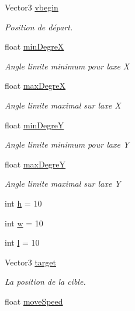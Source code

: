 \begin{DoxyCompactItemize}
Vector3 \mbox{\hyperlink{class_camera_control_a3d18c8c72678abfe638f07483c437b92}{vbegin}}
\begin{DoxyCompactList}\small\item\em Position de départ. \end{DoxyCompactList}\item 
float \mbox{\hyperlink{class_camera_control_a116fb7ac920ed4c84894420690b15174}{min\+DegreX}}
\begin{DoxyCompactList}\small\item\em Angle limite minimum pour l\textquotesingle{}axe X \end{DoxyCompactList}\item 
float \mbox{\hyperlink{class_camera_control_ad9804e1cf6d924768e6484ab8a0c34fa}{max\+DegreX}}
\begin{DoxyCompactList}\small\item\em Angle limite maximal sur l\textquotesingle{}axe X \end{DoxyCompactList}\item 
float \mbox{\hyperlink{class_camera_control_a7e187cb1ebfb3675d77110a8f1b99d83}{min\+DegreY}}
\begin{DoxyCompactList}\small\item\em Angle limite minimum pour l\textquotesingle{}axe Y \end{DoxyCompactList}\item 
float \mbox{\hyperlink{class_camera_control_a08f75fdf96fae8ac44850764c10085ac}{max\+DegreY}}
\begin{DoxyCompactList}\small\item\em Angle limite maximal sur l\textquotesingle{}axe Y \end{DoxyCompactList}\item 
int \mbox{\hyperlink{class_camera_control_aee06e1c0a46ffd42fcd8abe1c2f5a40a}{h}} = 10
\item 
int \mbox{\hyperlink{class_camera_control_a4080a1d529cac09e1384bb0420ba87d3}{w}} = 10
\item 
int \mbox{\hyperlink{class_camera_control_a0e883a505f663ed202947cb60995ded6}{l}} = 10
\item 
Vector3 \mbox{\hyperlink{class_camera_control_abd85110007706858516ca14f5bfc130b}{target}}
\begin{DoxyCompactList}\small\item\em La position de la cible. \end{DoxyCompactList}\item 
float \mbox{\hyperlink{class_camera_control_a9f3b5fd423d7a84a3014b7fd1d9ec254}{move\+Speed}}

\end{DoxyCompactItemize}
